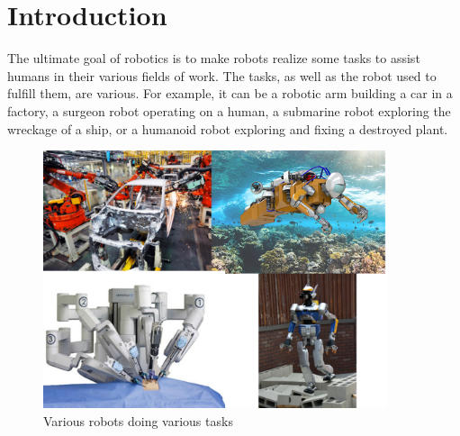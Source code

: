 

\chapter*{Introduction}
\label{cha:introduction}

\graphicspath{{Chapter0-Introduction/Figs/Vector/}{Chapter0-Introduction/Figs/}}

The ultimate goal of robotics is to make robots realize some tasks to assist humans in their various fields of work.
The tasks, as well as the robot used to fulfill them, are various.
For example, it can be a robotic arm building a car in a factory, a surgeon robot operating on a human, a submarine robot exploring the wreckage of a ship, or a humanoid robot exploring and fixing a destroyed plant.

\begin{figure}[ht]
  \centering
  \includegraphics[width=0.9\textwidth]{various-tasks.png}
  \caption{Various robots doing various tasks}
\label{fig:various}
\end{figure}

